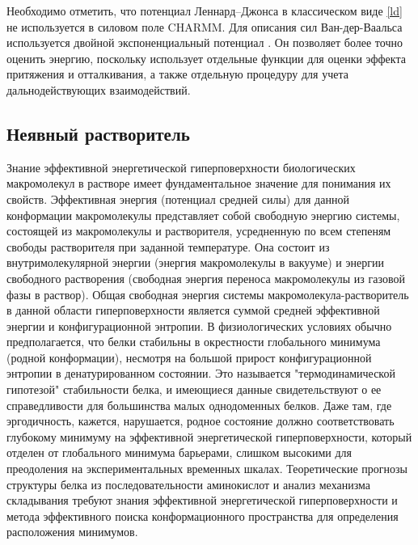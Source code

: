 Необходимо отметить, что потенциал Леннард--Джонса в классическом виде \ref{ld} не используется в силовом поле CHARMM. Для описания сил Ван-дер-Ваальса используется двойной экспоненциальный потенциал \cite{wu}. Он позволяет более точно оценить энергию, поскольку использует отдельные функции для оценки эффекта притяжения и отталкивания, а также отдельную процедуру для учета дальнодействующих взаимодействий.

\subsection{Неявный растворитель}


Знание эффективной энергетической гиперповерхности биологических макромолекул в растворе имеет фундаментальное значение для понимания их свойств. Эффективная энергия (потенциал средней силы) для данной конформации макромолекулы представляет собой свободную энергию системы, состоящей из макромолекулы и растворителя, усредненную по всем степеням свободы растворителя при заданной температуре. Она состоит из внутримолекулярной энергии (энергия макромолекулы в вакууме) и энергии свободного растворения (свободная энергия переноса макромолекулы из газовой фазы в раствор). Общая свободная энергия системы макромолекула-растворитель в данной области гиперповерхности является суммой средней эффективной энергии и конфигурационной энтропии. В физиологических условиях обычно предполагается, что белки стабильны в окрестности глобального минимума (родной конформации), несмотря на большой прирост конфигурационной энтропии в денатурированном состоянии. Это называется "термодинамической гипотезой" стабильности белка, и имеющиеся данные свидетельствуют о ее справедливости для большинства малых однодоменных белков. Даже там, где эргодичность, кажется, нарушается, родное состояние должно соответствовать глубокому минимуму на эффективной энергетической гиперповерхности, который отделен от глобального минимума барьерами, слишком высокими для преодоления на экспериментальных временных шкалах. Теоретические прогнозы структуры белка из последовательности аминокислот и анализ механизма складывания требуют знания эффективной энергетической гиперповерхности и метода эффективного поиска конформационного пространства для определения расположения минимумов.

